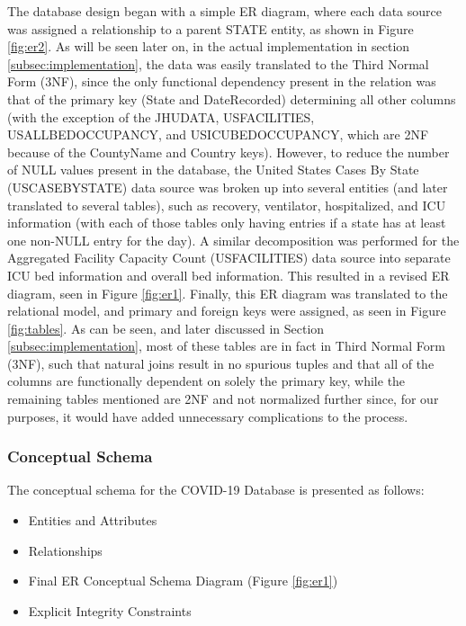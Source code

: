 \documentclass[11pt]{article}
\begin{document}
\noindent
The database design began with a simple ER diagram, where each data source was assigned a relationship to a parent STATE entity, as shown in Figure \ref{fig:er2}. As will be seen later on, in the actual implementation in section \ref{subsec:implementation}, the data was easily translated to the Third Normal Form (3NF), since the only functional dependency present in the relation was that of the primary key (State and DateRecorded) determining all other columns (with the exception of the JHUDATA, USFACILITIES, USALLBEDOCCUPANCY, and USICUBEDOCCUPANCY, which are 2NF because of the CountyName and Country keys). However, to reduce the number of NULL values present in the database, the United States Cases By State (USCASEBYSTATE) data source was broken up into several entities (and later translated to several tables), such as recovery, ventilator, hospitalized, and ICU information (with each of those tables only having entries if a state has at least one non-NULL entry for the day). A similar decomposition was performed for the Aggregated Facility Capacity Count (USFACILITIES) data source into separate ICU bed information and overall bed information. This resulted in a revised ER diagram, seen in Figure \ref{fig:er1}. Finally, this ER diagram was translated to the relational model, and primary and foreign keys were assigned, as seen in Figure \ref{fig:tables}. As can be seen, and later discussed in Section \ref{subsec:implementation}, most of these tables are in fact in Third Normal Form (3NF), such that natural joins result in no spurious tuples and that all of the columns are functionally dependent on solely the primary key, while the remaining tables mentioned are 2NF and not normalized further since, for our purposes, it would have added unnecessary complications to the process. 

\subsubsection{Conceptual Schema}
\label{subsubsec:concept}

\noindent
The conceptual schema for the COVID-19 Database is presented as follows:

\begin{itemize}
    \item Entities and Attributes
    \item Relationships
    \item Final ER Conceptual Schema Diagram (Figure \ref{fig:er1})
    \item Explicit Integrity Constraints
\end{itemize}
\end{document}
